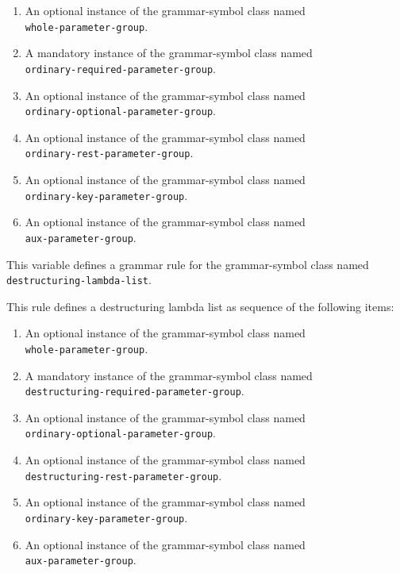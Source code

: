 \begin{enumerate}
\item An optional instance of the grammar-symbol class named\\
  \texttt{whole-parameter-group}.
\item A mandatory instance of the grammar-symbol class named\\
  \texttt{ordinary-required-parameter-group}.
\item An optional instance of the grammar-symbol class named\\
  \texttt{ordinary-optional-parameter-group}.
\item An optional instance of the grammar-symbol class named\\
\texttt{ordinary-rest-parameter-group}.
\item An optional instance of the grammar-symbol class named\\
\texttt{ordinary-key-parameter-group}.
\item An optional instance of the grammar-symbol class named\\
\texttt{aux-parameter-group}.
\end{enumerate}


This variable defines a grammar rule for the grammar-symbol class
named \texttt{destructuring-lambda-list}.

This rule defines a destructuring lambda list as sequence of the
following items:

\begin{enumerate}
\item An optional instance of the grammar-symbol class named\\
  \texttt{whole-parameter-group}.
\item A mandatory instance of the grammar-symbol class named\\
  \texttt{destructuring-required-parameter-group}.
\item An optional instance of the grammar-symbol class named\\
  \texttt{ordinary-optional-parameter-group}.
\item An optional instance of the grammar-symbol class named\\
\texttt{destructuring-rest-parameter-group}.
\item An optional instance of the grammar-symbol class named\\
\texttt{ordinary-key-parameter-group}.
\item An optional instance of the grammar-symbol class named\\
\texttt{aux-parameter-group}.
\end{enumerate}

